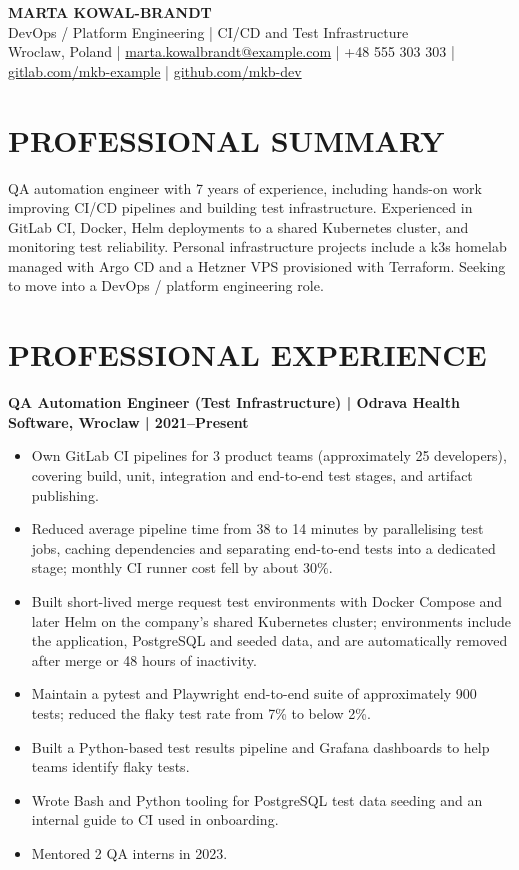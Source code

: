 \documentclass[11pt,a4paper]{article}
\begin{document}
\begin{center}
{\Huge\bfseries\color{primarycolor} MARTA KOWAL-BRANDT}\\[0.4em]
{\large\color{accentcolor} DevOps / Platform Engineering | CI/CD and Test Infrastructure}\\[0.3em]
Wroclaw, Poland | \href{mailto:marta.kowalbrandt@example.com}{marta.kowalbrandt@example.com} | +48 555 303 303 | \href{https://gitlab.com/mkb-example}{gitlab.com/mkb-example} | \href{https://github.com/mkb-dev}{github.com/mkb-dev}
\end{center}

\section*{PROFESSIONAL SUMMARY}
QA automation engineer with 7 years of experience, including hands-on work improving CI/CD pipelines and building test infrastructure. Experienced in GitLab CI, Docker, Helm deployments to a shared Kubernetes cluster, and monitoring test reliability. Personal infrastructure projects include a k3s homelab managed with Argo CD and a Hetzner VPS provisioned with Terraform. Seeking to move into a DevOps / platform engineering role.

\section*{PROFESSIONAL EXPERIENCE}
\textbf{QA Automation Engineer (Test Infrastructure) | Odrava Health Software, Wroclaw | 2021–Present}
\begin{itemize}
\item Own GitLab CI pipelines for 3 product teams (approximately 25 developers), covering build, unit, integration and end-to-end test stages, and artifact publishing.
\item Reduced average pipeline time from 38 to 14 minutes by parallelising test jobs, caching dependencies and separating end-to-end tests into a dedicated stage; monthly CI runner cost fell by about 30\%.
\item Built short-lived merge request test environments with Docker Compose and later Helm on the company's shared Kubernetes cluster; environments include the application, PostgreSQL and seeded data, and are automatically removed after merge or 48 hours of inactivity.
\item Maintain a pytest and Playwright end-to-end suite of approximately 900 tests; reduced the flaky test rate from 7\% to below 2\%.
\item Built a Python-based test results pipeline and Grafana dashboards to help teams identify flaky tests.
\item Wrote Bash and Python tooling for PostgreSQL test data seeding and an internal guide to CI used in onboarding.
\item Mentored 2 QA interns in 2023.
\end{itemize}
\end{document}
